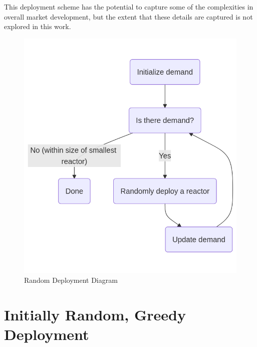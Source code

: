This deployment scheme has the potential to capture some of the complexities in
overall market development, but the extent that these details are captured is
not explored in this work. %

\begin{figure}[!htbp]
    \centering
    \includegraphics[scale=0.4]{images/schemes/random_diagram.png}
    \caption{Random Deployment Diagram}
    \label{fig:random_diagram}
\end{figure}



\section{Initially Random, Greedy Deployment}


